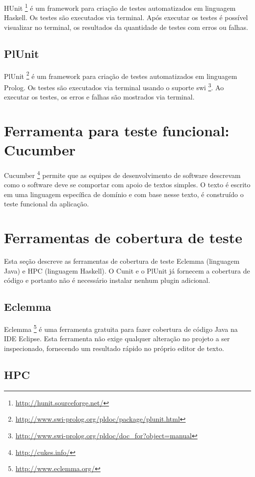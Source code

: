 HUnit \footnote{\url {http://hunit.sourceforge.net/}} é um framework para criação de testes automatizados em linguagem Haskell. Os testes são executados via terminal. Após executar os testes é possível visualizar no terminal, os resultados da quantidade de testes com erros ou falhas.

\subsection{PlUnit}

PlUnit \footnote{\url {http://www.swi-prolog.org/pldoc/package/plunit.html}} é um framework para criação de testes automatizados em linguagem Prolog. Os testes são executados via terminal usando o suporte swi \footnote{\url{ http://www.swi-prolog.org/pldoc/doc_for?object=manual}}. Ao executar os testes, os erros e falhas são mostrados via terminal.

\section{Ferramenta para teste funcional: Cucumber}

Cucumber \footnote{\url{ http://cukes.info/}} permite que as equipes de desenvolvimento de software descrevam como o software deve se comportar com apoio de textos simples. O texto é escrito em uma linguagem específica de domínio e com base nesse texto, é construído o teste funcional da aplicação.

\section{Ferramentas de cobertura de teste}

Esta seção descreve as ferramentas de cobertura de teste Eclemma (linguagem Java) e HPC (linguagem Haskell). O Cunit e o PlUnit já fornecem a cobertura de código e portanto não é necessário instalar nenhum plugin adicional.

\subsection{Eclemma}

Eclemma \footnote{\url{http://www.eclemma.org/}} é uma ferramenta gratuita para fazer cobertura de código Java na IDE Eclipse. Esta ferramenta não exige qualquer alteração no projeto a ser inspecionado, fornecendo um resultado rápido no próprio editor de texto.

\subsection{HPC}


